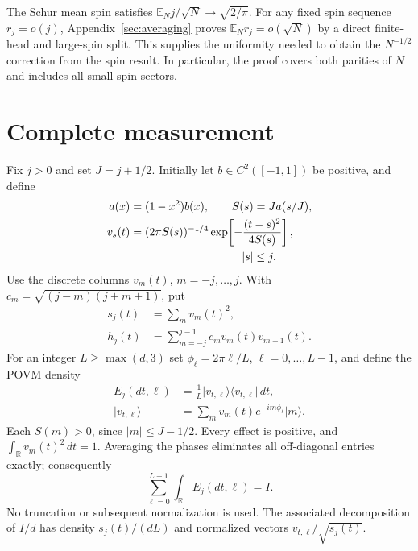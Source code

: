 \documentclass[aps,pra,reprint,superscriptaddress]{revtex4-2}
\theoremstyle{remark}
\newcommand{\R}{\mathbb R}
\newcommand{\ket}[1]{\lvert#1\rangle}
\newcommand{\bra}[1]{\langle#1\rvert}
\begin{document}
The Schur mean spin satisfies
$\mathbb E_N j/\sqrt N\to\sqrt{2/\pi}$. For any fixed spin sequence
$r_j=o(j)$, Appendix~\ref{sec:averaging} proves
$\mathbb E_N r_j=o(\sqrt N)$ by a direct finite-head and
large-spin split. This supplies the uniformity needed to obtain
the $N^{-1/2}$ correction from the spin result. In particular,
the proof covers both parities of $N$ and includes all small-spin
sectors.

\section{Complete measurement}\label{sec:gaussian}
Fix $j>0$ and set $J=j+1/2$. Initially let
$b\in C^2([-1,1])$ be positive, and define
\begin{equation}
\begin{aligned}
a(x)&=(1-x^2)b(x),\qquad S(s)=Ja(s/J),\\
v_s(t)&=(2\pi S(s))^{-1/4}
 \exp\!\left[-\frac{(t-s)^2}{4S(s)}\right],\\
&\hspace{35mm}|s|\leq j.
\end{aligned}
\label{eq:columns}
\end{equation}
Use the discrete columns $v_m(t)$, $m=-j,\ldots,j$. With
$c_m=\sqrt{(j-m)(j+m+1)}$, put
\begin{equation}
\begin{aligned}
s_j(t)&=\sum_m v_m(t)^2,\\
h_j(t)&=\sum_{m=-j}^{j-1}c_mv_m(t)v_{m+1}(t).
\end{aligned}
\label{eq:sh}
\end{equation}
For an integer $L\geq\max(d,3)$ set
$\phi_\ell=2\pi\ell/L$, $\ell=0,\ldots,L-1$, and define the POVM density
\begin{equation}
\begin{aligned}
E_j(dt,\ell)&=\frac1L\ket{v_{t,\ell}}\bra{v_{t,\ell}}\,dt,\\
\ket{v_{t,\ell}}&=\sum_m v_m(t)e^{-im\phi_\ell}\ket m.
\end{aligned}
\label{eq:gaussian-povm}
\end{equation}
Each $S(m)>0$, since $|m|\leq J-1/2$. Every effect is positive,
and $\int_\R v_m(t)^2\,dt=1$. Averaging the phases eliminates all
off-diagonal entries exactly; consequently
\begin{equation}
 \sum_{\ell=0}^{L-1}\int_\R E_j(dt,\ell)=I.
 \label{eq:complete}
\end{equation}
No truncation or subsequent normalization is used. The associated
decomposition of $I/d$ has density $s_j(t)/(dL)$ and normalized
vectors $v_{t,\ell}/\sqrt{s_j(t)}$.
\end{document}
